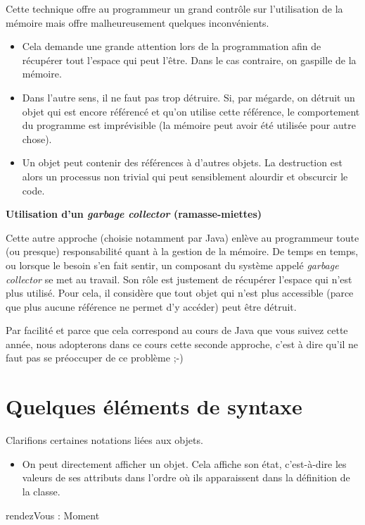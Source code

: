 {
Cette technique offre au programmeur un grand contrôle sur l’utilisation
de la mémoire mais offre malheureusement quelques inconvénients.}

\liststyleListv
\begin{itemize}
\item {
Cela demande une grande attention lors de la programmation afin de
récupérer tout l’espace qui peut l’être. Dans le cas contraire, on
gaspille de la mémoire.}
\item {
Dans l’autre sens, il ne faut pas trop détruire. Si, par mégarde, on
détruit un objet qui est encore référencé et qu'on
utilise cette référence, le comportement du programme est imprévisible
(la mémoire peut avoir été utilisée pour autre chose).}
\item {
Un objet peut contenir des références à d’autres objets. La destruction
est alors un processus non trivial qui peut sensiblement alourdir et
obscurcir le code.}
\end{itemize}
{\sffamily\bfseries\upshape
Utilisation d’un \textit{garbage collector} (ramasse-miettes)}

{
Cette autre approche (choisie notamment par Java) enlève au programmeur
toute (ou presque) responsabilité quant à la gestion de la mémoire. De
temps en temps, ou lorsque le besoin s’en fait sentir, un composant du
système appelé \textit{garbage collector} se met au travail. Son rôle
est justement de récupérer l’espace qui n’est plus utilisé. Pour cela,
il considère que tout objet qui n'est plus accessible
(parce que plus aucune référence ne permet d’y accéder) peut être
détruit.}

{
Par facilité et parce que cela correspond au cours de Java que vous
suivez cette année, nous adopterons dans ce cours cette seconde
approche, c'est à dire qu'il ne faut
pas se préoccuper de ce problème ;-)}

\section{Quelques éléments de syntaxe}
{
Clarifions certaines notations liées aux objets.}

\liststyleListv
\begin{itemize}
\item {
On peut directement afficher un objet. Cela affiche son état,
c'est-à-dire les valeurs de ses attributs dans
l'ordre où ils apparaissent dans la définition de la
classe.}
\end{itemize}
{\sffamily
rendezVous : Moment}

